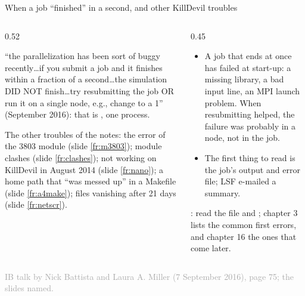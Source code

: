 \documentclass[aspectratio=169,11pt]{beamer}
\newcommand{\sourcecredit}[1]{\vfill\begin{flushright}\tiny\textcolor{DarkGray}{#1}\end{flushright}}
\begin{document}
\begin{frame}{When a job ``finished'' in a second, and other KillDevil troubles}
\label{fr:kdtroubles}
\begin{columns}[T,onlytextwidth]
\begin{column}{0.52\textwidth}
\begin{homebox}
\footnotesize ``the parallelization has been sort of buggy recently\ldots if you submit a job and it finishes within a fraction of a second\ldots the simulation DID NOT finish\ldots try resubmitting the job OR run it on a single node, e.g., change to a 1'' (September 2016): that is , one process.
\end{homebox}
\vspace{1mm}
\footnotesize The other troubles of the notes: the  error of the 3803 module (slide \ref{fr:m3803}); module clashes (slide \ref{fr:clashes});  not working on KillDevil in August 2014 (slide \ref{fr:nano}); a home path that ``was messed up'' in a Makefile (slide \ref{fr:a4make});  files vanishing after 21 days (slide \ref{fr:netscr}).
\end{column}
\begin{column}{0.45\textwidth}
\footnotesize
\begin{itemize}\setlength{\itemsep}{2pt}
  \item A job that ends at once has failed at start-up: a missing library, a bad input line, an MPI launch problem. When resubmitting helped, the failure was probably in a node, not in the job.
  \item The first thing to read is the job's output and error file; LSF e-mailed a summary.
\end{itemize}
\vspace{1mm}
: read the  file and ; chapter 3 lists the common first errors, and chapter 16 the ones that come later.
\end{column}
\end{columns}
\sourcecredit{IB talk by Nick Battista and Laura A. Miller (7 September 2016), page 75; the slides named.}
\end{frame}
\end{document}

